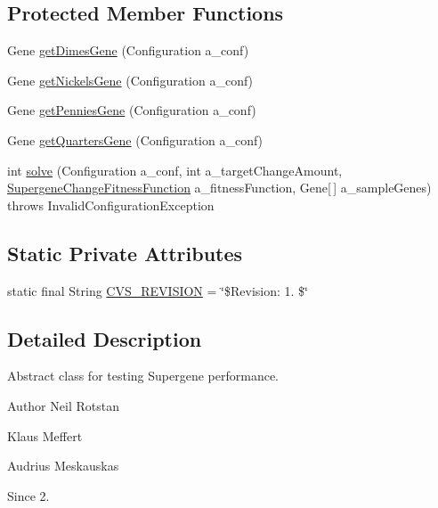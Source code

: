 \subsection*{Protected Member Functions}
\begin{DoxyCompactItemize}
\item 
Gene \hyperlink{classexamples_1_1supergene_1_1_abstract_supergene_test_a4dd26799d08a8f8d1e2bfcf047c42738}{get\-Dimes\-Gene} (Configuration a\-\_\-conf)
\item 
Gene \hyperlink{classexamples_1_1supergene_1_1_abstract_supergene_test_a6d4533c657828b3d0e98dda17572dcb6}{get\-Nickels\-Gene} (Configuration a\-\_\-conf)
\item 
Gene \hyperlink{classexamples_1_1supergene_1_1_abstract_supergene_test_aac16c07ab37989c472d80acc4071dafe}{get\-Pennies\-Gene} (Configuration a\-\_\-conf)
\item 
Gene \hyperlink{classexamples_1_1supergene_1_1_abstract_supergene_test_a1b9e8ef8f0436df0feee9337f7c437bd}{get\-Quarters\-Gene} (Configuration a\-\_\-conf)
\item 
int \hyperlink{classexamples_1_1supergene_1_1_abstract_supergene_test_a7f4bc155739845dcac0bc31ec952192d}{solve} (Configuration a\-\_\-conf, int a\-\_\-target\-Change\-Amount, \hyperlink{classexamples_1_1supergene_1_1_supergene_change_fitness_function}{Supergene\-Change\-Fitness\-Function} a\-\_\-fitness\-Function, Gene\mbox{[}$\,$\mbox{]} a\-\_\-sample\-Genes)  throws Invalid\-Configuration\-Exception 
\end{DoxyCompactItemize}
\subsection*{Static Private Attributes}
\begin{DoxyCompactItemize}
\item 
static final String \hyperlink{classexamples_1_1supergene_1_1_abstract_supergene_test_a3bf642196176bfe1e85adea8652098b7}{C\-V\-S\-\_\-\-R\-E\-V\-I\-S\-I\-O\-N} = \char`\"{}\$Revision\-: 1. \$\char`\"{}
\end{DoxyCompactItemize}


\subsection{Detailed Description}
Abstract class for testing Supergene performance.

\begin{DoxyAuthor}{Author}
Neil Rotstan 

Klaus Meffert 

Audrius Meskauskas 
\end{DoxyAuthor}
\begin{DoxySince}{Since}
2. 
\end{DoxySince}


